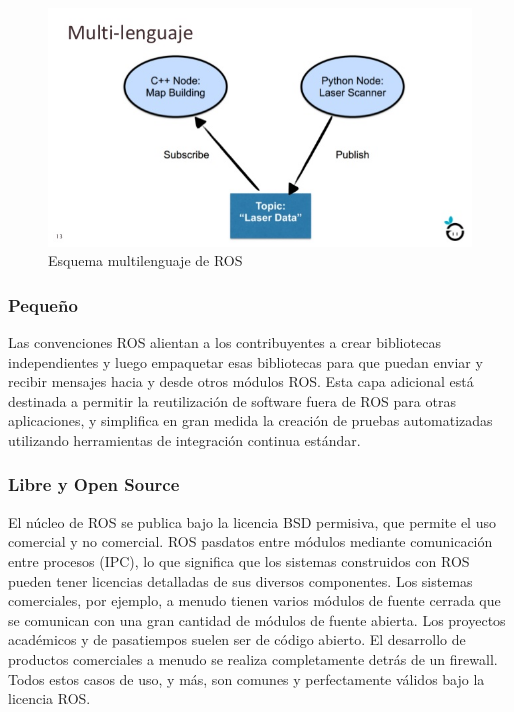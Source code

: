             \begin{figure}[htb]
                \centering
                \includegraphics[width=0.9\linewidth]{Main/Chapter3/Images3/3-5/esquema-multi-lenguaje-ros.png}
                \caption{Esquema multilenguaje de ROS}
                \label{f:Cap3-5_multilenguaje_ros}
            \end{figure}
            
        \subsubsection{Pequeño}
        
            Las convenciones ROS alientan a los contribuyentes a crear bibliotecas independientes y luego empaquetar esas bibliotecas para que puedan enviar y recibir mensajes hacia y desde otros módulos ROS. Esta capa adicional está destinada a permitir la reutilización de software fuera de ROS para otras aplicaciones, y simplifica en gran medida la creación de pruebas automatizadas utilizando herramientas de integración continua estándar.
            
        \subsubsection{Libre y Open Source}
        
            El núcleo de ROS se publica bajo la licencia BSD permisiva, que permite el uso comercial y no comercial. ROS pas\subsua datos entre módulos mediante comunicación entre procesos (IPC), lo que significa que los sistemas construidos con ROS pueden tener licencias detalladas de sus diversos componentes. Los sistemas comerciales, por ejemplo, a menudo tienen varios módulos de fuente cerrada que se comunican con una gran cantidad de módulos de fuente abierta. Los proyectos académicos y de pasatiempos suelen ser de código abierto. El desarrollo de productos comerciales a menudo se realiza completamente detrás de un firewall. Todos estos casos de uso, y más, son comunes y perfectamente válidos bajo la licencia ROS.
            
